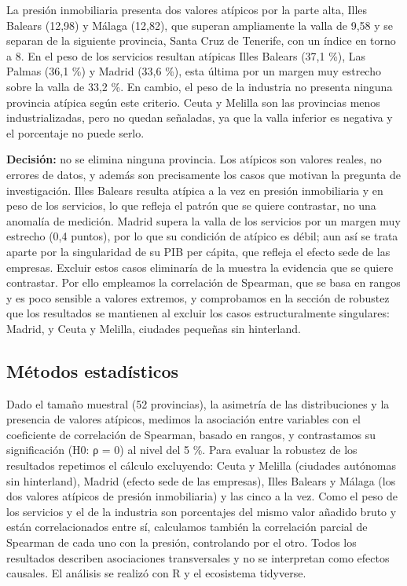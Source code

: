\documentclass[econometrics,article,submit,moreauthors,pdftex]{Definitions/mdpi}
\begin{document}
La presión inmobiliaria presenta dos valores atípicos por la parte alta,
Illes Balears (12,98) y Málaga (12,82), que superan ampliamente la valla
de 9,58 y se separan de la siguiente provincia, Santa Cruz de Tenerife,
con un índice en torno a 8. En el peso de los servicios resultan
atípicas Illes Balears (37,1 \%), Las Palmas (36,1 \%) y Madrid (33,6
\%), esta última por un margen muy estrecho sobre la valla de 33,2 \%.
En cambio, el peso de la industria no presenta ninguna provincia atípica
según este criterio. Ceuta y Melilla son las provincias menos
industrializadas, pero no quedan señaladas, ya que la valla inferior es
negativa y el porcentaje no puede serlo.

\textbf{Decisión:} no se elimina ninguna provincia. Los atípicos son
valores reales, no errores de datos, y además son precisamente los casos
que motivan la pregunta de investigación. Illes Balears resulta atípica
a la vez en presión inmobiliaria y en peso de los servicios, lo que
refleja el patrón que se quiere contrastar, no una anomalía de medición.
Madrid supera la valla de los servicios por un margen muy estrecho (0,4
puntos), por lo que su condición de atípico es débil; aun así se trata
aparte por la singularidad de su PIB per cápita, que refleja el efecto
sede de las empresas. Excluir estos casos eliminaría de la muestra la
evidencia que se quiere contrastar. Por ello empleamos la correlación de
Spearman, que se basa en rangos y es poco sensible a valores extremos, y
comprobamos en la sección de robustez que los resultados se mantienen al
excluir los casos estructuralmente singulares: Madrid, y Ceuta y
Melilla, ciudades pequeñas sin hinterland.

\subsection{Métodos estadísticos}\label{muxe9todos-estaduxedsticos}

Dado el tamaño muestral (52 provincias), la asimetría de las
distribuciones y la presencia de valores atípicos, medimos la asociación
entre variables con el coeficiente de correlación de Spearman, basado en
rangos, y contrastamos su significación (H0: ρ = 0) al nivel del 5 \%.
Para evaluar la robustez de los resultados repetimos el cálculo
excluyendo: Ceuta y Melilla (ciudades autónomas sin hinterland), Madrid
(efecto sede de las empresas), Illes Balears y Málaga (los dos valores
atípicos de presión inmobiliaria) y las cinco a la vez. Como el peso de
los servicios y el de la industria son porcentajes del mismo valor
añadido bruto y están correlacionados entre sí, calculamos también la
correlación parcial de Spearman de cada uno con la presión, controlando
por el otro. Todos los resultados describen asociaciones transversales y
no se interpretan como efectos causales. El análisis se realizó con R y
el ecosistema tidyverse.
\end{document}
